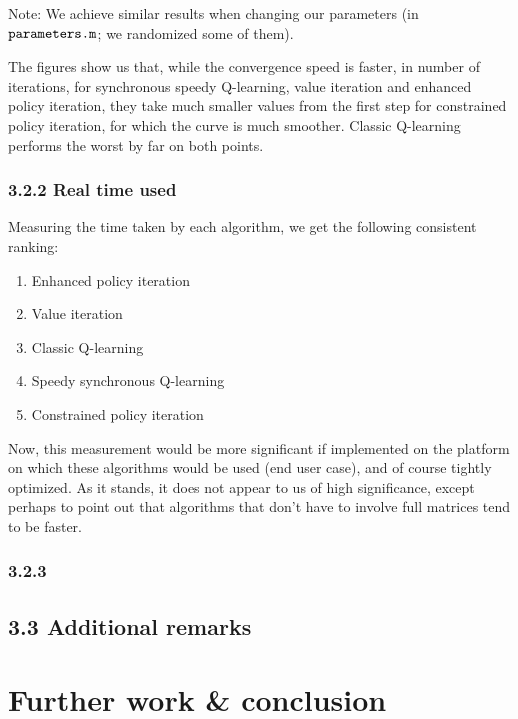 \documentclass[a4paper, 12pt]{report}
\begin{document}
Note: We achieve similar results when changing our parameters (in $\verb|parameters.m|$; we randomized some of them).

The figures show us that, while the convergence speed is faster, in number of iterations, for synchronous speedy Q-learning,
value iteration and enhanced policy iteration, they take much smaller values from the first step for constrained policy iteration, for
which the curve is much smoother.
Classic Q-learning performs the worst by far on both points.

\subsection*{3.2.2 Real time used}

Measuring the time taken by each algorithm, we get the following consistent ranking:
\begin{enumerate}
\item Enhanced policy iteration
\item Value iteration
\item Classic Q-learning
\item Speedy synchronous Q-learning
\item Constrained policy iteration
\end{enumerate}

Now, this measurement would be more significant if implemented on the platform on which these algorithms would be used (end user case),
and of course tightly optimized.
As it stands, it does not appear to us of high significance, except perhaps to point out that algorithms that don't have to involve full matrices tend to be faster.

\subsection*{3.2.3 }

\section*{3.3 Additional remarks}

\chapter*{Further work \& conclusion}



\end{document}
